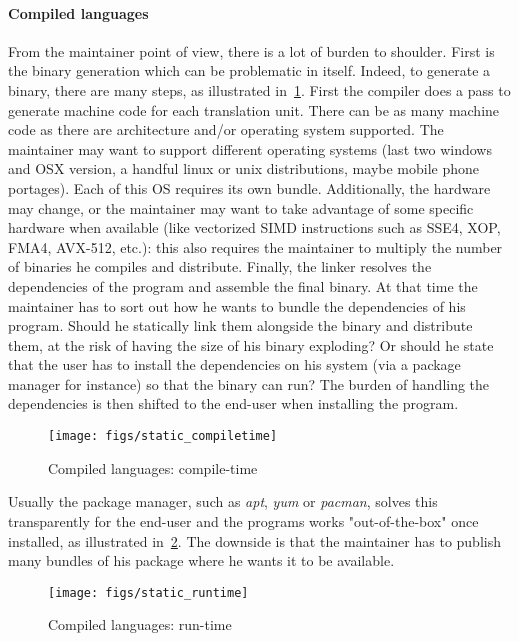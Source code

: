 \paragraph{Compiled languages} From the maintainer point of view, there is a lot of burden to shoulder. First is the
binary generation which can be problematic in itself. Indeed, to generate a binary, there are many steps, as illustrated
in~\cref{fig:static.dynamic.compiled.compiletime}. First the compiler does a pass to generate machine code for each
translation unit. There can be as many machine code as there are architecture and/or operating system supported. The
maintainer may want to support different operating systems (last two windows and OSX version, a handful linux or unix
distributions, maybe mobile phone portages). Each of this OS requires its own bundle. Additionally, the hardware may
change, or the maintainer may want to take advantage of some specific hardware when available (like vectorized SIMD
instructions such as SSE4, XOP, FMA4, AVX-512, etc.): this also requires the maintainer to multiply the number of
binaries he compiles and distribute. Finally, the linker resolves the dependencies of the program and assemble the final
binary. At that time the maintainer has to sort out how he wants to bundle the dependencies of his program. Should he
statically link them alongside the binary and distribute them, at the risk of having the size of his binary exploding?
Or should he state that the user has to install the dependencies on his system (via a package manager for instance) so
that the binary can run? The burden of handling the dependencies is then shifted to the end-user when installing the
program.

\begin{figure}[htbp]
  \centering
  \texttt{[image: figs/static\_compiletime]}
  \caption{Compiled languages: compile-time}
  \label{fig:static.dynamic.compiled.compiletime}
\end{figure}


Usually the package manager, such as \emph{apt}, \emph{yum} or \emph{pacman}, solves this transparently for the end-user
and the programs works "out-of-the-box" once installed, as illustrated in~\cref{fig:static.dynamic.compiled.runtime}.
The downside is that the maintainer has to publish many bundles of his package where he wants it to be available.

\begin{figure}[htbp]
  \centering
  \texttt{[image: figs/static\_runtime]}
  \caption{Compiled languages: run-time}
  \label{fig:static.dynamic.compiled.runtime}
\end{figure}


